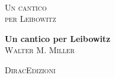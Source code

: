 \pagestyle{empty} %

{
	\centering
	
	~
	
	\vspace{24pt}
	{\scshape\Huge Un cantico\\per Leibowitz \par}
}

\cleardoublepage

\newlength\drop
\makeatletter
\newcommand*\titleM{\begingroup%
	\setlength\drop{0.08\textheight}
	\centering
	\vspace*{\drop}
	{\Huge\bfseries Un cantico per Leibowitz}\\[\baselineskip]
	{\scshape Walter M. Miller}\\[\baselineskip]
	\vfill
	{\large\scshape \phantom{the author}}\par
	\vfill
	{\large\scshape DiracEdizioni }\par
	\endgroup}
\makeatother
	
\titleM

\clearpage

\null\vfill

